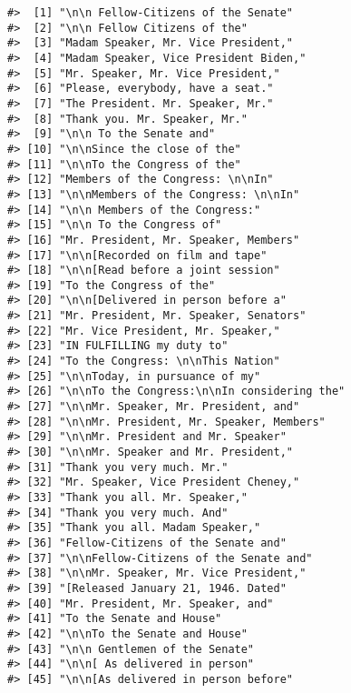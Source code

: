 \documentclass[]{book}
\begin{document}
\begin{verbatim}
#>  [1] "\n\n Fellow-Citizens of the Senate"            
#>  [2] "\n\n Fellow Citizens of the"                   
#>  [3] "Madam Speaker, Mr. Vice President,"            
#>  [4] "Madam Speaker, Vice President Biden,"          
#>  [5] "Mr. Speaker, Mr. Vice President,"              
#>  [6] "Please, everybody, have a seat."               
#>  [7] "The President. Mr. Speaker, Mr."               
#>  [8] "Thank you. Mr. Speaker, Mr."                   
#>  [9] "\n\n To the Senate and"                        
#> [10] "\n\nSince the close of the"                    
#> [11] "\n\nTo the Congress of the"                    
#> [12] "Members of the Congress: \n\nIn"               
#> [13] "\n\nMembers of the Congress: \n\nIn"           
#> [14] "\n\n Members of the Congress:"                 
#> [15] "\n\n To the Congress of"                       
#> [16] "Mr. President, Mr. Speaker, Members"           
#> [17] "\n\n[Recorded on film and tape"                
#> [18] "\n\n[Read before a joint session"              
#> [19] "To the Congress of the"                        
#> [20] "\n\n[Delivered in person before a"             
#> [21] "Mr. President, Mr. Speaker, Senators"          
#> [22] "Mr. Vice President, Mr. Speaker,"              
#> [23] "IN FULFILLING my duty to"                      
#> [24] "To the Congress: \n\nThis Nation"              
#> [25] "\n\nToday, in pursuance of my"                 
#> [26] "\n\nTo the Congress:\n\nIn considering the"    
#> [27] "\n\nMr. Speaker, Mr. President, and"           
#> [28] "\n\nMr. President, Mr. Speaker, Members"       
#> [29] "\n\nMr. President and Mr. Speaker"             
#> [30] "\n\nMr. Speaker and Mr. President,"            
#> [31] "Thank you very much. Mr."                      
#> [32] "Mr. Speaker, Vice President Cheney,"           
#> [33] "Thank you all. Mr. Speaker,"                   
#> [34] "Thank you very much. And"                      
#> [35] "Thank you all. Madam Speaker,"                 
#> [36] "Fellow-Citizens of the Senate and"             
#> [37] "\n\nFellow-Citizens of the Senate and"         
#> [38] "\n\nMr. Speaker, Mr. Vice President,"          
#> [39] "[Released January 21, 1946. Dated"             
#> [40] "Mr. President, Mr. Speaker, and"               
#> [41] "To the Senate and House"                       
#> [42] "\n\nTo the Senate and House"                   
#> [43] "\n\n Gentlemen of the Senate"                  
#> [44] "\n\n[ As delivered in person"                  
#> [45] "\n\n[As delivered in person before"            

\end{verbatim}
\end{document}
